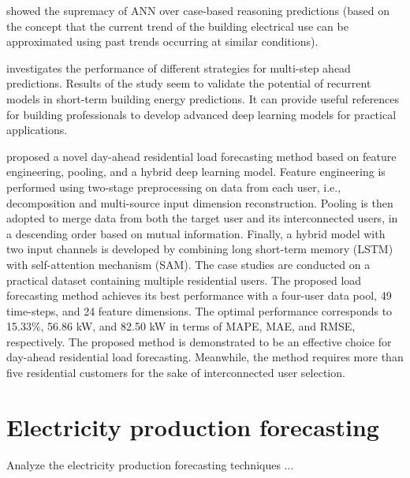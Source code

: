 \cite{PLATON201510} showed the supremacy of ANN over case-based reasoning predictions (based on the concept that the current trend of the building electrical use can be approximated using past trends occurring at similar conditions).

\cite{FAN2019700} investigates the performance of different strategies for multi-step ahead predictions.
Results of the study seem to validate the potential of recurrent models in short-term building energy predictions.
It can provide useful references for building professionals to develop advanced deep learning models for practical applications.

\cite{ZANG2021120682} proposed a novel day-ahead residential load forecasting method based on feature engineering, pooling, and a hybrid deep learning model.
Feature engineering is performed using two-stage preprocessing on data from each user, i.e., decomposition and multi-source input dimension reconstruction.
Pooling is then adopted to merge data from both the target user and its interconnected users, in a descending order based on mutual information.
Finally, a hybrid model with two input channels is developed by combining long short-term memory (LSTM) with self-attention mechanism (SAM).
The case studies are conducted on a practical dataset containing multiple residential users.
The proposed load forecasting method achieves its best performance with a four-user data pool, 49 time-steps, and 24 feature dimensions.
The optimal performance corresponds to 15.33\%, 56.86 kW, and 82.50 kW in terms of MAPE, MAE, and RMSE, respectively.
The proposed method is demonstrated to be an effective choice for day-ahead residential load forecasting. Meanwhile, the method requires more than five residential customers for the sake of interconnected user selection.


\section{Electricity production forecasting}
\label{sec:productionsoa}
\vspace{0.2 cm}

Analyze the electricity production forecasting techniques ...
